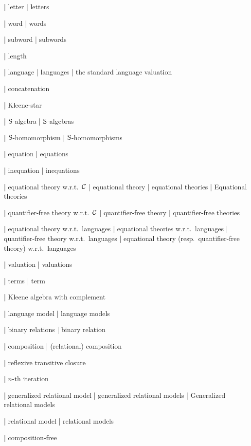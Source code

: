 | letter
| letters

| word
| words

| subword
| subwords

| length

| language
| languages
| the standard language valuation

| concatenation

| Kleene-star

| $\mathrm{S}$-algebra
| $\mathrm{S}$-algebras

| $\mathrm{S}$-homomorphism
| $\mathrm{S}$-homomorphisms


| equation
| equations

| inequation
| inequations

| equational theory w.r.t.\ $\algclass$
| equational theory
| equational theories
| Equational theories

| quantifier-free theory w.r.t.\ $\algclass$
| quantifier-free theory
| quantifier-free theories


| equational theory w.r.t.\ languages
| equational theories w.r.t.\ languages
| quantifier-free theory w.r.t.\ languages
| equational theory (resp.\ quantifier-free theory) w.r.t.\ languages

| valuation
| valuations

| terms
| term

| Kleene algebra with complement

| language model
| language models


| binary relations
| binary relation

| composition
| (relational) composition

| reflexive transitive closure

| $n$-th iteration

| generalized relational model
| generalized relational models
| Generalized relational models

| relational model
| relational models

| composition-free

